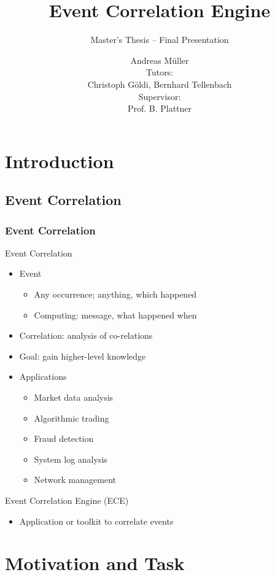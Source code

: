 \documentclass[10pt]{beamer}
\title[]{Event Correlation Engine}
\subtitle{Master's Thesis -- Final Presentation}
\author{Andreas Müller\\[0.8em]Tutors:\\Christoph Göldi, Bernhard Tellenbach\\[0.8em]Supervisor:\\Prof. B. Plattner}
\institute{}
\date{}
\begin{document}
\begin{frame}[plain]
	\titlepage
\end{frame}

\setcounter{tocdepth}{1}
\frame[plain]{\tableofcontents}
\setcounter{tocdepth}{2}

\section{Introduction}
\subsection{Event Correlation}
\begin{frame}
	\frametitle{Event Correlation}
	\begin{block}{Event Correlation}
		\begin{itemize}
			\item Event
				\begin{itemize}
					\item Any occurrence; anything, which happened
					\item Computing: message, what happened when
				\end{itemize}
			\item Correlation: analysis of co-relations
			\item Goal: gain higher-level knowledge
			\item Applications
				\begin{itemize}
					\item Market data analysis
					\item Algorithmic trading
					\item Fraud detection
					\item System log analysis
					\item Network management
				\end{itemize}
		\end{itemize}
	\end{block}
	\begin{block}{Event Correlation Engine (ECE)}
		\begin{itemize}
			\item Application or toolkit to correlate events 
		\end{itemize}
	\end{block}
\end{frame}

\section{Motivation and Task}
\end{document}
